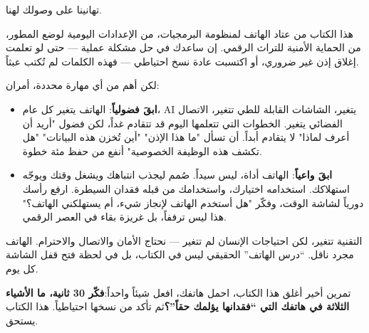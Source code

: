
تهانينا على وصولك لهنا.

هذا الكتاب من عتاد الهاتف لمنظومة البرمجيات، من الإعدادات اليومية لوضع المطور، من الحماية الأمنية للتراث الرقمي. إن ساعدك في حل مشكلة عملية — حتى لو تعلمت إغلاق إذن غير ضروري، أو اكتسبت عادة نسخ احتياطي — فهذه الكلمات لم تُكتب عبثاً.

لكن أهم من أي مهارة محددة، أمران:

\begin{itemize}
  \item \textbf{ابقَ فضولياً}: الهاتف يتغير كل عام، AI يتغير، الشاشات القابلة للطي تتغير، الاتصال الفضائي يتغير. الخطوات التي تتعلمها اليوم قد تتقادم غداً، لكن فضول "أريد أن أعرف لماذا" لا يتقادم أبداً. أن تسأل "ما هذا الإذن" "أين تُخزن هذه البيانات" "هل تكشف هذه الوظيفة الخصوصية" أنفع من حفظ مئة خطوة.
  \item \textbf{ابقَ واعياً}: الهاتف أداة، ليس سيداً. صُمم ليجذب انتباهك ويشغل وقتك ويوجّه استهلاكك. استخدامه اختيارك، واستخدامك من قبله فقدان السيطرة. ارفع رأسك دورياً لشاشة الوقت، وفكّر "هل أستخدم الهاتف لإنجاز شيء، أم يستهلكني الهاتف؟" هذا ليس ترففاً، بل غريزة بقاء في العصر الرقمي.
\end{itemize}

التقنية تتغير، لكن احتياجات الإنسان لم تتغير — نحتاج الأمان والاتصال والاحترام. الهاتف مجرد ناقل. “درس الهاتف” الحقيقي ليس في الكتاب، بل في لحظة فتح قفل الشاشة كل يوم.

\begin{tcbpractice}{تمرين أخير}
أغلق هذا الكتاب، احمل هاتفك، افعل شيئاً واحداً:\textbf{فكّر 30 ثانية، ما الأشياء الثلاثة في هاتفك التي “فقدانها يؤلمك حقاً”؟}ثم تأكد من نسخها احتياطياً. هذا الكتاب يستحق.

\end{tcbpractice}
